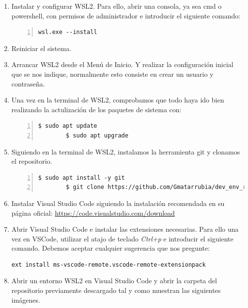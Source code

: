 \begin{enumerate}
    \item Instalar y configurar \gls{WSL2}. Para ello, abrir una consola, ya sea cmd
    o powershell, con permisos de administrador e introducir el siguiente comando:
    \begin{lstlisting}[style=cmd, numbers=left]
        wsl.exe --install
    \end{lstlisting}

    \item Reiniciar el sistema.

    \item Arrancar \gls{WSL2} desde el Menú de Inicio. Y realizar la configuración
    inicial que se nos indique, normalmente esto consiste en crear un usuario y
    contraseña.

    \item Una vez en la terminal de \gls{WSL2}, comprobamos que todo haya ido bien realizando
    la actulización de los paquetes de sistema con:
    \begin{lstlisting}[style=consola, numbers=left]
        $ sudo apt update
        $ sudo apt upgrade
    \end{lstlisting}

    \item Siguiendo en la terminal de \gls{WSL2}, instalamos la herramienta git y clonamos
    el repositorio.
    \begin{lstlisting}[style=consola, numbers=left]
        $ sudo apt install -y git
        $ git clone https://github.com/Gmatarrubia/dev_env_rpi_flutter_yocto.git
    \end{lstlisting}

    \item Instalar Visual Studio Code siguiendo la instalación recomendada en su página
    oficial: \href{https://code.visualstudio.com/download}{https://code.visualstudio.com/download}

    \item Abrir Visual Studio Code e instalar las extensiones necesarias. Para ello
    una vez en VSCode, utilizar el atajo de teclado \emph{Ctrl+p} e introducir el siguiente
    comando. Debemos aceptar cualquier sugerencia que nos pregunte:
    \begin{lstlisting}[style=cmd]
        ext install ms-vscode-remote.vscode-remote-extensionpack
    \end{lstlisting}

    \item Abrir un entorno \gls{WSL2} en Visual Studio Code y abrir la carpeta del repositorio
    previamente descargado tal y como muestran las siguientes imágenes.


\end{enumerate}
